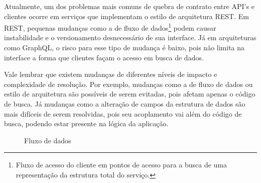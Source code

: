 Atualmente, um dos problemas mais comuns de quebra de contrato entre API's e clientes ocorre em serviços que implementam o estilo de arquitetura REST. Em REST, pequenas mudanças como a de fluxo de dados\footnote{
  Fluxo de acesso do cliente em pontos de acesso para a busca de uma representação da estrutura total do serviço.
} podem causar instabilidade e o versionamento desnecessário de sua interface. Já em arquiteturas como GraphQL, o risco para esse tipo de mudança é baixo, pois não limita na interface a forma que clientes façam o acesso em busca de dados.

Vale lembrar que existem mudanças de diferentes níveis de impacto e complexidade de resolução. Por exemplo, mudanças como a de fluxo de dados ou estilo de arquitetura são possíveis de serem evitadas, pois afetam apenas o código de busca. Já mudanças como a alteração de campos da estrutura de dados são mais difíceis de serem resolvidas, pois seu acoplamento vai além do código de busca, podendo estar presente na lógica da aplicação.

\begin{figure}[H]
  \centering
  \caption{Fluxo de dados}
\end{figure}


